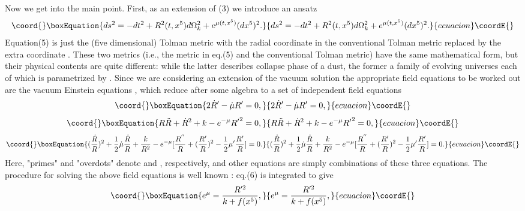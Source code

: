 \documentclass[a4paper,12pt]{article}
\begin{document}
Now we get into the main point. First, as an extension of (3) we
introduce an ansatz
\begin{equation}\coord{}\boxEquation{
ds^2= -dt^2 + R^2(t, x^5)d\Omega^2_k + e^{\mu(t,x^5)}(dx^5)^2 .
}{
ds^2= -dt^2 + R^2(t, x^5)d\Omega^2_k + e^{\mu(t,x^5)}(dx^5)^2 .
}{ecuacion}\coordE{}\end{equation}
Equation(5) is just the (five dimensional) Tolman metric with the
radial coordinate \coordHE{} in the conventional Tolman metric replaced
by the extra coordinate \coordHE{}. These two metrics (i.e., the metric
in eq.(5) and the conventional Tolman metric) have the same
mathematical form, but their physical contents are quite
different: while the latter describes collapse phase of a dust,
the former a family of evolving universes each of which is
parametrized by \coordHE{}. Since we are considering an extension of
the vacuum solution the appropriate field equations to be worked
out are the vacuum Einstein equations \coordHE{}, which reduce
after some algebra to a set of independent field equations
\begin{equation}\coord{}\boxEquation{
2\dot{R}^{\prime} - \dot{\mu}R^{\prime} = 0 ,
}{
2\dot{R}^{\prime} - \dot{\mu}R^{\prime} = 0 ,
}{ecuacion}\coordE{}\end{equation}
\begin{equation}\coord{}\boxEquation{
R\ddot{R} + \dot{R}^{2} + k - e^{-\mu}{R^{\prime}}^2 = 0 ,
}{
R\ddot{R} + \dot{R}^{2} + k - e^{-\mu}{R^{\prime}}^2 = 0 ,
}{ecuacion}\coordE{}\end{equation}
\begin{equation}\coord{}\boxEquation{
(\frac{\dot{R}}{R})^2 + \frac{1}{2}\dot{\mu}\frac{\dot{R}}{R} +
\frac{k}{R^2} - e^{-\mu}[\frac{R^{''}}{R} +
(\frac{R^{\prime}}{R})^2 - \frac{1}{2}\mu^{\prime}
\frac{R^{\prime}}{R} ] = 0 .
}{
(\frac{\dot{R}}{R})^2 + \frac{1}{2}\dot{\mu}\frac{\dot{R}}{R} +
\frac{k}{R^2} - e^{-\mu}[\frac{R^{''}}{R} +
(\frac{R^{\prime}}{R})^2 - \frac{1}{2}\mu^{\prime}
\frac{R^{\prime}}{R} ] = 0 .
}{ecuacion}\coordE{}\end{equation}
Here, "primes" and "overdots" denote \coordHE{} and \coordHE{},
respectively, and other equations are simply combinations of these
three equations. The procedure for solving the above field
equations is well known \cite{car}: eq.(6) is integrated to give
\begin{equation}\coord{}\boxEquation{
e^{\mu} = \frac{R^{\prime\/ 2}}{k + f(x^5)} ,
}{
e^{\mu} = \frac{R^{\prime\/ 2}}{k + f(x^5)} ,
}{ecuacion}\coordE{}\end{equation}
\end{document}
